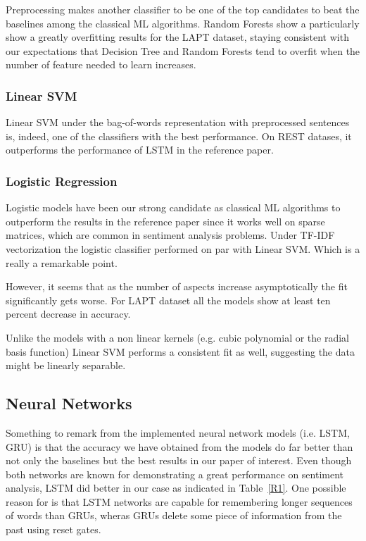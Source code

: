\documentclass[comsoc,conference]{IEEEtran}
\begin{document}
Preprocessing makes another classifier to be one of the top candidates to beat the baselines among the classical ML algorithms. Random Forests show a particularly show a greatly overfitting results for the LAPT dataset, staying consistent with our expectations that Decision Tree and Random Forests tend to overfit when the number of feature needed to learn increases.

\subsubsection{Linear SVM}

Linear SVM under the bag-of-words representation with preprocessed sentences is, indeed, one of the classifiers with the best performance. On REST datases, it outperforms the performance of LSTM in the reference paper.

\subsubsection{Logistic Regression}

Logistic models have been our strong candidate as classical ML algorithms to outperform the results in the reference paper since it works well on sparse matrices, which are common in sentiment analysis problems. Under TF-IDF vectorization the logistic classifier performed on par with Linear SVM.  Which is a really a remarkable point.

However, it seems that as the number of aspects increase asymptotically the fit significantly gets worse. For LAPT dataset all the models show at least ten percent decrease in accuracy.

Unlike the models with a non linear kernels (e.g. cubic polynomial or the radial basis function) Linear SVM performs a consistent fit as well, suggesting the data might be linearly separable.

\color{black}

\subsection{Neural Networks}

Something to remark from the implemented neural network models (i.e. LSTM, GRU) is that the accuracy we have obtained from the models do far better than not only the baselines but the best results in our paper of interest. Even though both networks are known for demonstrating a great performance on sentiment analysis, LSTM did better in our case as indicated in Table~\ref{R1}. One possible reason for is that LSTM networks are capable for remembering longer sequences of words than GRUs, wheras GRUs delete some piece of information from the past using reset gates.
\end{document}
